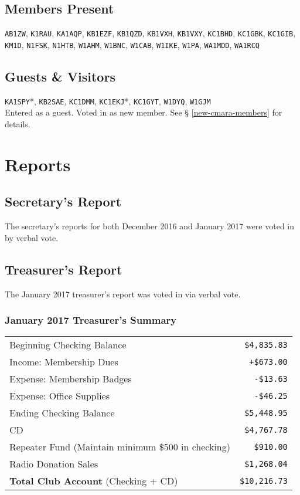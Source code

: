 \documentclass[10pt,letterpaper]{article}
\begin{document}
\subsection{Members Present}
\texttt{AB1ZW},
\texttt{K1RAU},
\texttt{KA1AQP},
\texttt{KB1EZF},
\texttt{KB1QZD},
\texttt{KB1VXH},
\texttt{KB1VXY},
\texttt{KC1BHD},
\texttt{KC1GBK},
\texttt{KC1GIB},
\texttt{KM1D},
\texttt{N1FSK},
\texttt{N1HTB},
\texttt{W1AHM},
\texttt{W1BNC},
\texttt{W1CAB},
\texttt{W1IKE},
\texttt{W1PA},
\texttt{WA1MDD},
\texttt{WA1RCQ}

\subsection{Guests \& Visitors}
\texttt{KA1SPY}*,
\texttt{KB2SAE},
\texttt{KC1DMM},
\texttt{KC1EKJ}*,
\texttt{KC1GYT},
\texttt{W1DYQ},
\texttt{W1GJM}\\

\noindent
\textasteriskcentered{} Entered as a guest. Voted in as new member. See \S{} \ref{new-cmara-members} for details.

\section{Reports}

\subsection{Secretary's Report}
The secretary's reports for both December 2016 and January 2017 were voted in by verbal vote.

\newpage
\subsection{Treasurer's Report}
The January 2017 treasurer's report was voted in via verbal vote.

\subsubsection{January 2017 Treasurer's Summary}
\noindent
\begin{tabular}{|l|r|}
  \hline
  Beginning Checking Balance & \texttt{\$4,835.83} \\
  Income: Membership Dues & \texttt{+\$673.00} \\
  Expense: Membership Badges & \texttt{-\$13.63} \\
  Expense: Office Supplies & \texttt{-\$46.25} \\
  Ending Checking Balance & \texttt{\$5,448.95} \\
  \hline
  \hline
  CD & \texttt{\$4,767.78} \\
  \hline
  \hline
  Repeater Fund (Maintain minimum \$500 in checking) & \texttt{\$910.00} \\
  \hline
  \hline
  Radio Donation Sales & \texttt{\$1,268.04} \\
  \hline
  \hline
  \textbf{Total Club Account} (Checking + CD) & \texttt{\$10,216.73} \\
  \hline
\end{tabular}
\end{document}
